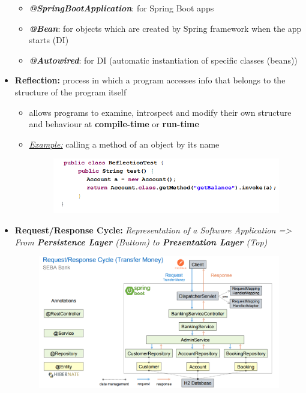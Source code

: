 \documentclass[ieeetran]{article}
\begin{document}
\begin{itemize}
\begin{itemize}
\item \textbf{\textit{@SpringBootApplication}}: for Spring Boot apps
\item \textbf{\textit{@Bean}}: for objects which are created by Spring framework when the app starts (DI)
\item \textbf{\textit{@Autowired}}: for DI (automatic instantiation of specific classes (beans)) 


\end{itemize}

\item \textbf{Reflection:} process in which a program accesses info that belongs to the structure of the program itself
\begin{itemize}
  \item allows programs to examine, introspect and modify their own structure and behaviour at \textbf{compile-time} or \textbf{run-time}

\item \underline{\textit{Example:}} calling a method of an object by its name
	\begin{figure}[h!]
	  \centering
	  \includegraphics[width=0.7\linewidth]{reflection.png}
	  \label{fig:reflection_png}
	\end{figure}
\end{itemize}

\item \textbf{Request/Response Cycle:} \textit{Representation of a Software Application => From \textbf{Persistence Layer} (Buttom) to \textbf{Presentation Layer} (Top)}
	\begin{figure}[h!]
	  \centering
	  \includegraphics[width=0.7\linewidth]{reqrepcycle.png}
	  \label{fig:reqrepcycle_png}
	\end{figure}
\end{itemize}
\end{document}
